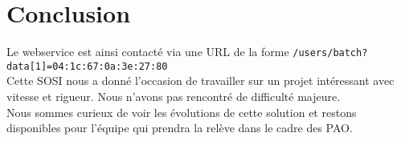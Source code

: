 \chapter*{Conclusion}

Le webservice est ainsi contacté via une URL de la forme \verb|/users/batch?data[1]=04:1c:67:0a:3e:27:80|\\

Cette SOSI nous a donné l'occasion de travailler sur un projet intéressant avec vitesse et rigueur. Nous n'avons pas rencontré de difficulté majeure.\\

Nous sommes curieux de voir les évolutions de cette solution et restons disponibles pour l'équipe qui prendra la relève dans le cadre des PAO.

